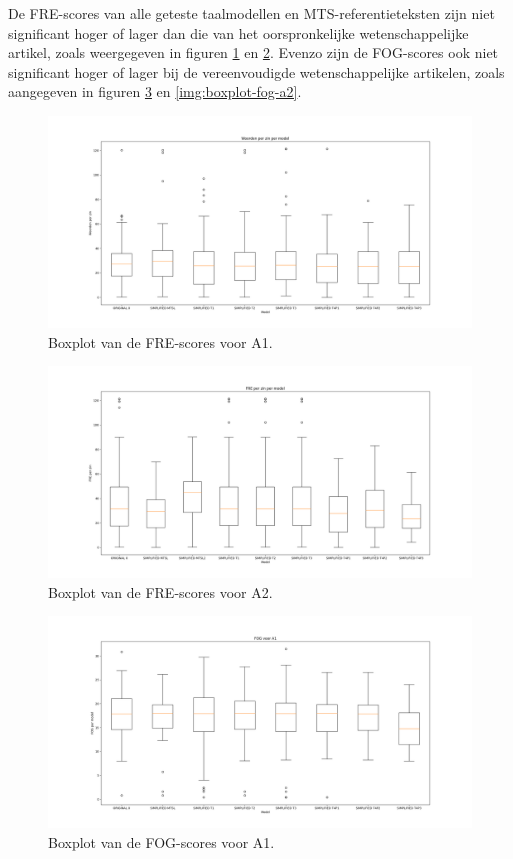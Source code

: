 De FRE-scores van alle geteste taalmodellen en MTS-referentieteksten zijn niet significant hoger of lager dan die van het oorspronkelijke wetenschappelijke artikel, zoals weergegeven in figuren \ref{img:boxplot-fre-a1} en \ref{img:boxplot-fre-a2}. Evenzo zijn de FOG-scores ook niet significant hoger of lager bij de vereenvoudigde wetenschappelijke artikelen, zoals aangegeven in figuren \ref{img:boxplot-fog-a1} en \ref{img:boxplot-fog-a2}. 


\begin{figure}
	\includegraphics[width=\linewidth]{img/boxplot-fre-a1.png}
	\caption{Boxplot van de FRE-scores voor A1.}
	\label{img:boxplot-fre-a1}
\end{figure}

\begin{figure}
	\includegraphics[width=\linewidth]{img/boxplot-fre-a2.png}
	\caption{Boxplot van de FRE-scores voor A2.}
	\label{img:boxplot-fre-a2}
\end{figure}

\begin{figure}
	\includegraphics[width=\linewidth]{img/boxplot-fog-a1.png}
	\caption{Boxplot van de FOG-scores voor A1.}
	\label{img:boxplot-fog-a1}
\end{figure}

